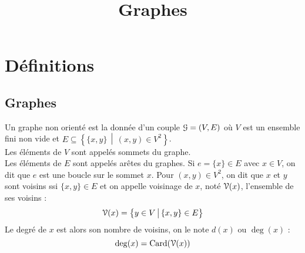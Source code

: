 
\usepackage{euscript}
\newcommand{\vois}{\EuScript{V}}
\newcommand{\Pred}{\EuScript{P}\text{{red}}}
\newcommand{\Succ}{\EuScript{S}\text{{ucc}}}
\newcommand{\1}{\bbm{1}}
\newcommand{\accesno}{\leftrightarrow}
\newcommand{\acceso}{\widetilde{\leftrightarrow}}
\newcommand{\bord}{\EuScript{B}}
\newcommand{\ouv}{\EuScript{O}}
\newcommand{\ferm}{\EuScript{F}}
\DeclareMathOperator{\dist}{dist}
\DeclareMathOperator{\lng}{long}

\newcommand{\algfun}[1]{\text{\textsf{#1}}}
\newcommand{\escr}[1]{\EuScript{#1}}



\title{Graphes}

\section{Définitions}

	\subsection{Graphes}
		
		\eqskip{2mm}
		\begin{Definitions}
			Un graphe non orienté est la donnée d'un couple \(\EuScript{G} = (V,E)\) où \(V\) est un ensemble fini non vide et \(E\subseteq \left\{\!\{x,y\}\,\middle|\,(x,y) \in V^2\right\}\). \\
			\bdot Les éléments de \(V\) sont appelés sommets du graphe. \\
			\bdot Les éléments de \(E\) sont appelés arêtes du graphes. \nt
			Si \(e =\{x\} \in E\) avec \(x\in V\), on dit que \(e\) est une boucle sur le sommet \(x\). \nll
			Pour \((x,y)\in V^2\), on dit que \(x\) et \(y\) sont voisins ssi \(\{x,y\}\in E\) et on appelle voisinage de \(x\), noté \(\vois(x)\), l'ensemble de ses voisins :
				\[
					\vois(x) = \left\{y\in V\,\middle|\, \{x,y\}\in E\right\}
				\]
			Le degré de \(x\) est alors son nombre de voisins, on le note \(d(x)\) ou \(\deg(x)\) :
				\[
					\deg(x) = \card(\vois(x))
				\]
		\end{Definitions}
		
